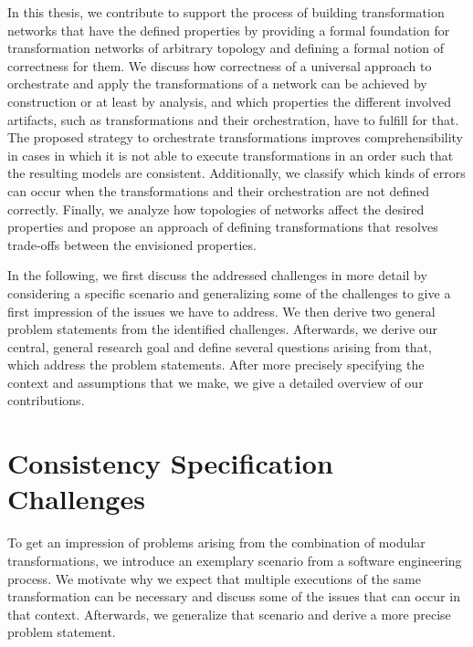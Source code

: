 In this thesis, we contribute to support the process of building transformation networks that have the defined properties by providing a formal foundation for transformation networks of arbitrary topology and defining a formal notion of correctness for them.
We discuss how correctness of a universal approach to orchestrate and apply the transformations of a network can be achieved by construction or at least by analysis, and which properties the different involved artifacts, such as transformations and their orchestration, have to fulfill for that.
The proposed strategy to orchestrate transformations improves comprehensibility in cases in which it is not able to execute transformations in an order such that the resulting models are consistent.
Additionally, we classify which kinds of errors can occur when the transformations and their orchestration are not defined correctly.
Finally, we analyze how topologies of networks affect the desired properties and propose an approach of defining transformations that resolves trade-offs between the envisioned properties.

In the following, we first discuss the addressed challenges in more detail by considering a specific scenario and generalizing some of the challenges to give a first impression of the issues we have to address.
We then derive two general problem statements from the identified challenges.
Afterwards, we derive our central, general research goal and define several questions arising from that, which address the problem statements.
After more precisely specifying the context and assumptions that we make, we give a detailed overview of our contributions.



\section{Consistency Specification Challenges}

To get an impression of problems arising from the combination of modular transformations, we introduce an exemplary scenario from a software engineering process.
We motivate why we expect that multiple executions of the same transformation can be necessary and discuss some of the issues that can occur in that context.
Afterwards, we generalize that scenario and derive a more precise problem statement.

